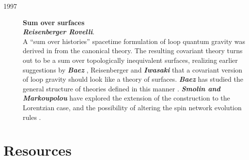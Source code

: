 \documentclass[12pt]{article}
\begin{document}
\begin{description}
	\item[1997] {\bf Sum over surfaces\\
	{\em Reisenberger Rovelli}}.\\  
	A ``sum over histories'' spacetime formulation of loop 
	quantum gravity was derived in 
	\cite{RovelliSurf,ReisenbergerRovelli} from the canonical 
	theory.  The resulting covariant theory turns out to be a sum 
	over topologically inequivalent surfaces, realizing earlier 
	suggestions by \textbf{\em Baez\/} 
	\cite{Baez,Baez2,Baez95a,Baez4}, Reisenberger  
	\cite{Reisenberger,Reisenberger94} and \textbf{\em Iwasaki\/} 
	\cite{Iwasaki} that a covariant version of loop gravity 
	should look like a theory of surfaces.  \textbf{\em Baez} has 
	studied the general structure of theories defined in this 
	manner \cite{Baez97}.  \textbf{\em Smolin and Markoupolou} 
	have explored the extension of the construction to the 
	Lorentzian case, and the possibility of altering the spin 
	network evolution rules \cite{SmolinMarkopoulo}.


\end{description}

\section{Resources}\label{3.5}
\end{document}
